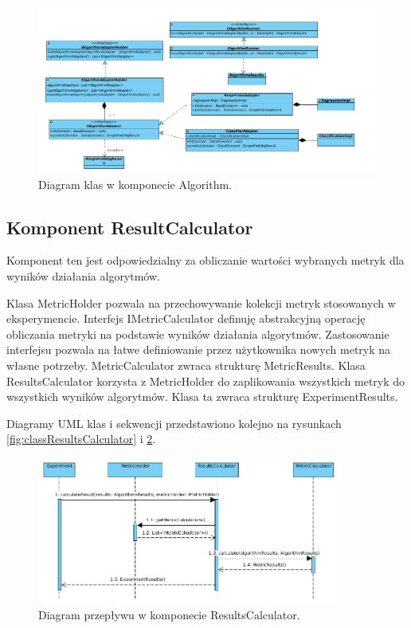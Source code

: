 \documentclass[12pt]{article}
\begin{document}
\begin{figure}[!h]
\centering
	\includegraphics[width=1.0\textwidth]{img/class_diagrams/algorithm.png}
	\caption{Diagram klas w komponecie Algorithm.}
	\label{fig:classAlgorithm}
\end{figure}
\newpage

\subsection{Komponent ResultCalculator}

Komponent ten jest odpowiedzialny za obliczanie wartości wybranych metryk dla wyników działania algorytmów.

Klasa MetricHolder pozwala na przechowywanie kolekcji metryk stosowanych w eksperymencie. Interfejs IMetricCalculator definuję abstrakcyjną operację obliczania metryki na podstawie wyników działania algorytmów. Zastosowanie interfejsu pozwala na łatwe definiowanie przez użytkownika nowych metryk na własne potrzeby. MetricCalculator zwraca strukturę MetricResults. Klasa ResultsCalculator korzysta z MetricHolder do zaplikowania wszystkich metryk do wszystkich wyników algorytmów. Klasa ta zwraca strukturę ExperimentResults.


Diagramy UML klas i sekwencji przedstawiono kolejno na rysunkach \ref{fig:classResultsCalculator} i \ref{fig:sequenceResultsCalculator}.

\begin{figure}[!h]
	\centering
	\includegraphics[width=0.9\textwidth]{img/sequenceResultsCalculator.png}
	\caption{Diagram przepływu w komponecie ResultsCalculator.}
	\label{fig:sequenceResultsCalculator}
\end{figure}
\end{document}
